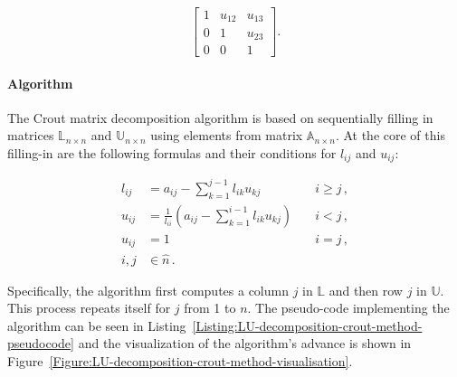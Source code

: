 \begin{equation}
	\begin{bmatrix}
		1      & u_{12} & u_{13} \\
		0      & 1      & u_{23} \\
		0      & 0      & 1
	\end{bmatrix}.
\end{equation}

\paragraph{Algorithm}
The Crout matrix decomposition algorithm is based on sequentially filling in matrices $ \mathbb{L}_{n\times n} $ and $ \mathbb{U}_{n\times n} $ using elements from matrix $ \mathbb{A}_{n\times n} $. At the core of this filling-in are the following formulas and their conditions for $ l_{ij} $ and $ u_{ij} $:

\begin{align}
	l_{ij} &= a_{ij} - \sum_{k=1}^{j-1}l_{ik}u_{kj} 								  &\quad i \geq j\,, \label{Equation:LU-decomposition-crout-method-lij} \\
	u_{ij} &= \frac{1}{l_{ii}} \left ( a_{ij} - \sum_{k=1}^{i-1}l_{ik}u_{kj} \right ) &\quad i < j\,, \\ \label{Equation:LU-decomposition-crout-method-uij}
	u_{ij} &= 1 																	  &\quad i = j\,, \\
	i,j &\in \widehat{n} \nonumber\,.
\end{align}

Specifically, the algorithm first computes a column $ j $ in $ \mathbb{L} $ and then row $ j $ in $ \mathbb{U} $. This process repeats itself for $ j $ from 1 to $ n $. The pseudo-code implementing the algorithm can be seen in Listing~\ref{Listing:LU-decomposition-crout-method-pseudocode} and the visualization of the algorithm's advance is shown in Figure~\ref{Figure:LU-decomposition-crout-method-visualisation}.

